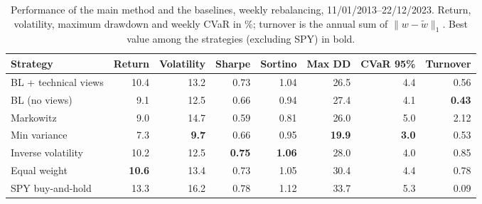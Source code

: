 \begin{table}[t]
\centering
\small
\caption{Performance of the main method and the baselines, weekly rebalancing, 11/01/2013--22/12/2023. Return, volatility, maximum drawdown and weekly CVaR in \%; turnover is the annual sum of $\lVert w - \tilde w \rVert_1$. Best value among the strategies (excluding SPY) in bold.}
\label{tab:metrics}
\begin{tabular}{lrrrrrrr}
\toprule
Strategy & Return & Volatility & Sharpe & Sortino & Max DD & CVaR 95\% & Turnover \\
\midrule
BL + technical views & 10.4 & 13.2 & 0.73 & 1.04 & 26.5 & 4.4 & 0.56 \\
BL (no views) & 9.1 & 12.5 & 0.66 & 0.94 & 27.4 & 4.1 & \textbf{0.43} \\
Markowitz & 9.0 & 14.7 & 0.59 & 0.81 & 26.0 & 5.0 & 2.12 \\
Min variance & 7.3 & \textbf{9.7} & 0.66 & 0.95 & \textbf{19.9} & \textbf{3.0} & 0.53 \\
Inverse volatility & 10.2 & 12.5 & \textbf{0.75} & \textbf{1.06} & 28.0 & 4.0 & 0.85 \\
Equal weight & \textbf{10.6} & 13.4 & 0.73 & 1.05 & 30.4 & 4.4 & 0.78 \\
\midrule
SPY buy-and-hold & 13.3 & 16.2 & 0.78 & 1.12 & 33.7 & 5.3 & 0.09 \\
\bottomrule
\end{tabular}
\end{table}
